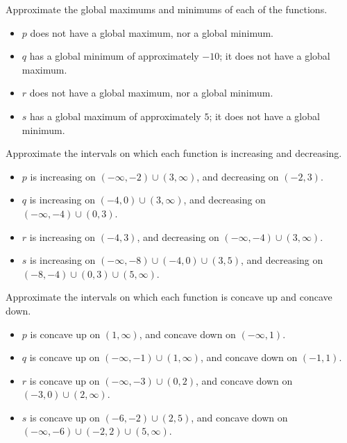 \begin{exercises}
\begin{problem}
\begin{subproblem}
\end{subproblem}
\begin{subproblem}
	Approximate the global maximums and minimums of each of the functions.
	\begin{shortsolution}
		\begin{itemize}
			\item $p$ does not have a global maximum, nor a global minimum.
			\item $q$ has a global minimum of approximately $-10$; it does not have a global maximum.
			\item $r$ does not have a global maximum, nor a global minimum.
			\item $s$ has a global maximum of approximately $5$; it does not have a global minimum.
		\end{itemize}
	\end{shortsolution}
\end{subproblem}
\begin{subproblem}
	Approximate the intervals on which each function is increasing and decreasing.
	\begin{shortsolution}
		\begin{itemize}
			\item $p$ is increasing on $(-\infty,-2)\cup (3,\infty)$, and decreasing on $(-2,3)$.
			\item $q$ is increasing on $(-4,0)\cup (3,\infty)$, and decreasing on $(-\infty,-4)\cup (0,3)$.
			\item $r$ is increasing on $(-4,3)$, and decreasing on $(-\infty,-4)\cup (3,\infty)$.
			\item $s$ is increasing on $(-\infty,-8)\cup (-4,0)\cup (3,5)$, and decreasing on $(-8,-4)\cup (0,3)\cup (5,\infty)$.
		\end{itemize}
	\end{shortsolution}
\end{subproblem}
\begin{subproblem}
	Approximate the intervals on which each function is concave up and concave down.
	\begin{shortsolution}
		\begin{itemize}
			\item $p$ is concave up on  $(1,\infty)$, and concave down on  $(-\infty,1)$.
			\item $q$ is concave up on $(-\infty,-1)\cup (1,\infty)$, and concave down on $(-1,1)$.
			\item $r$ is concave up on $(-\infty,-3)\cup (0,2)$, and concave down on $(-3,0)\cup (2,\infty)$.
			\item $s$ is concave up on $(-6,-2)\cup (2,5)$, and concave down on $(-\infty,-6)\cup (-2,2)\cup (5,\infty)$.
		\end{itemize}
	\end{shortsolution}
\end{subproblem}
\end{problem}


\end{exercises}
